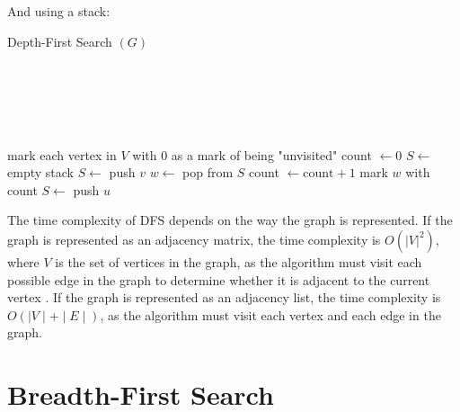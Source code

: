 \documentclass[12pt letter]{report}
\begin{document}
And using a stack:
\begin{algorithm}[H]
  \caption{Depth-First Search $ \left( G \right) $}
  \Comment{}\\
   \\
   \\
   \\
  \begin{algorithmic}[1]
    \State mark each vertex in $V$ with $0$ as a mark of being "unvisited"
    \State count $ \gets 0$
    \State  $S \gets $ empty stack
    \State $S \gets $ push $v$
    \State $w \gets $ pop from $S$
    \State count $ \gets \text{count} + 1$
    \State mark $w$ with count
    \State $S \gets $ push $u$
    \EndFor
    \EndIf
    \EndWhile
    \EndIf
    \EndFor
  \end{algorithmic}
\end{algorithm}

The time complexity of DFS depends on the way the graph is represented. If the graph is represented as an adjacency
matrix, the time complexity is $O \left( \left| V \right|^2 \right) $, where $V$ is the set of vertices in the graph, as
the algorithm must visit each possible edge in the graph to determine whether it is adjacent to the current vertex
. If
the graph is represented as an adjacency list, the time complexity is $O \left(  \mid V  \mid +  \mid E  \mid   \right)
$, as the algorithm must visit each vertex and each edge in the graph.

\section{Breadth-First Search}

\end{document}
